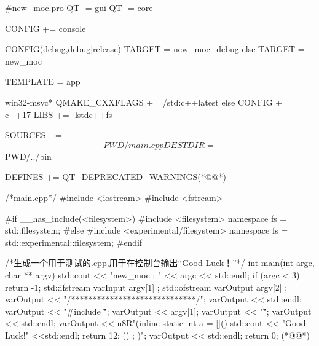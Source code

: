 \label{f00000b}    %
\FloatBarrier                                  %
\begin{thebookfilesourceone}[escapeinside={(*@}{@*)},
caption=GoodLuck,
title=\filesourcenumbernameone \thefilesourcenumber
]
#new_moc.pro
QT -= gui
QT -= core

CONFIG += console

CONFIG(debug,debug|release){
    TARGET = new_moc_debug
}else{
    TARGET = new_moc
}

TEMPLATE = app

win32-msvc*{
    QMAKE_CXXFLAGS += /std:c++latest
}else{
    CONFIG += c++17
    LIBS += -lstdc++fs
}

SOURCES += $$PWD/main.cpp
DESTDIR =  $$PWD/../bin

DEFINES += QT_DEPRECATED_WARNINGS(*@\marginpar[\hfill\setlength\fboxsep{2pt}\fbox{\footnotesize{\kaishu\parbox{1em}{\setlength{\baselineskip}{2pt}\filesourcenumbernameone}}\footnotesize{\thefilesourcenumber}}]{\setlength\fboxsep{2pt}\fbox{\footnotesize{\kaishu\parbox{1em}{\setlength{\baselineskip}{2pt}\filesourcenumbernameone}}\footnotesize{\thefilesourcenumber}}}@*)\end{thebookfilesourceone}          %
\addtocounter{lstlisting}{-1}   %
\label{f00000c}    %
\FloatBarrier                                  %
\begin{thebookfilesourceone}[escapeinside={(*@}{@*)},
caption=GoodLuck,
title=\filesourcenumbernameone \thefilesourcenumber
]
/*main.cpp*/
#include <iostream>
#include <fstream>

#if __has_include(<filesystem>)
#include <filesystem>
namespace fs = std::filesystem;
#else
#include <experimental/filesystem>
namespace fs = std::experimental::filesystem;
#endif

/*生成一个用于测试的.cpp,用于在控制台输出“Good Luck！”*/
int main(int argc, char ** argv) {
    std::cout << "new_moc : "
        << argc << std::endl;
    if (argc < 3) {
        return -1;
    }
    std::ifstream varInput{ argv[1] };
    std::ofstream varOutput{ argv[2] };
    varOutput << "/*****************************/";
    varOutput << std::endl;
    varOutput << "#include \"";
    varOutput << argv[1];
    varOutput << "\"";
    varOutput << std::endl;
    varOutput << u8R"(inline static int a = [](){
               std::cout << "Good Luck!" <<std::endl;
               return 12;
               }() ; )";
    varOutput << std::endl;
    return 0;
}(*@\marginpar[\hfill\setlength\fboxsep{2pt}\fbox{\footnotesize{\kaishu\parbox{1em}{\setlength{\baselineskip}{2pt}\filesourcenumbernameone}}\footnotesize{\thefilesourcenumber}}]{\setlength\fboxsep{2pt}\fbox{\footnotesize{\kaishu\parbox{1em}{\setlength{\baselineskip}{2pt}\filesourcenumbernameone}}\footnotesize{\thefilesourcenumber}}}@*)\end{thebookfilesourceone}          %
